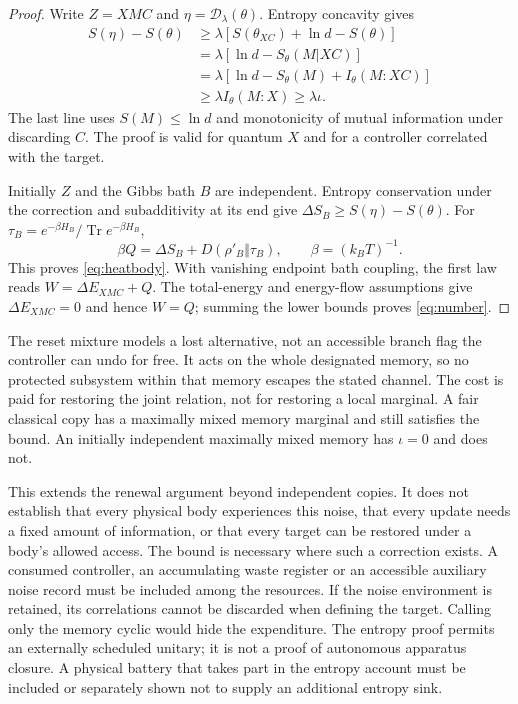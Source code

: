 \documentclass[12pt,a4paper]{article}
\begin{document}
\begin{proof}
Write $Z=XMC$ and $\eta=\mathcal D_\lambda(\theta)$. Entropy concavity gives
\begin{align*}
 S(\eta)-S(\theta)
 &\ge \lambda[S(\theta_{XC})+\ln d-S(\theta)]\\
 &=\lambda[\ln d-S_\theta(M|XC)]\\
 &=\lambda[\ln d-S_\theta(M)+I_\theta(M:XC)]\\
 &\ge\lambda I_\theta(M:X)\ge\lambda\iota.
\end{align*}
The last line uses $S(M)\le\ln d$ and monotonicity of mutual information under discarding $C$. The proof is valid for quantum $X$ and for a controller correlated with the target.

Initially $Z$ and the Gibbs bath $B$ are independent. Entropy conservation under the correction and subadditivity at its end give $\Delta S_B\ge S(\eta)-S(\theta)$. For $\tau_B=e^{-\beta H_B}/\operatorname{Tr}e^{-\beta H_B}$,
\[
 \beta Q=\Delta S_B+D(\rho'_B\Vert\tau_B),
 \qquad \beta=(k_BT)^{-1}.
\]
This proves \eqref{eq:heatbody}. With vanishing endpoint bath coupling, the first law reads $W=\Delta E_{XMC}+Q$. The total-energy and energy-flow assumptions give $\Delta E_{XMC}=0$ and hence $W=Q$; summing the lower bounds proves \eqref{eq:number}.
\end{proof}

The reset mixture models a lost alternative, not an accessible branch flag the controller can undo for free. It acts on the whole designated memory, so no protected subsystem within that memory escapes the stated channel. The cost is paid for restoring the joint relation, not for restoring a local marginal. A fair classical copy has a maximally mixed memory marginal and still satisfies the bound. An initially independent maximally mixed memory has $\iota=0$ and does not.

This extends the renewal argument beyond independent copies. It does not establish that every physical body experiences this noise, that every update needs a fixed amount of information, or that every target can be restored under a body's allowed access. The bound is necessary where such a correction exists. A consumed controller, an accumulating waste register or an accessible auxiliary noise record must be included among the resources. If the noise environment is retained, its correlations cannot be discarded when defining the target. Calling only the memory cyclic would hide the expenditure. The entropy proof permits an externally scheduled unitary; it is not a proof of autonomous apparatus closure. A physical battery that takes part in the entropy account must be included or separately shown not to supply an additional entropy sink.
\end{document}
